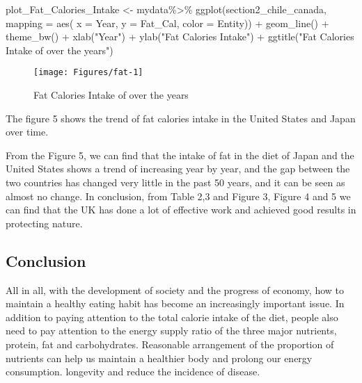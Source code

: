 \documentclass[11pt,a4paper,]{article}
\newenvironment{Shaded}{\begin{snugshade}}{\end{snugshade}}
\newcommand{\AttributeTok}[1]{\textcolor[rgb]{0.77,0.63,0.00}{#1}}
\newcommand{\FunctionTok}[1]{\textcolor[rgb]{0.00,0.00,0.00}{#1}}
\newcommand{\NormalTok}[1]{#1}
\newcommand{\OtherTok}[1]{\textcolor[rgb]{0.56,0.35,0.01}{#1}}
\newcommand{\SpecialCharTok}[1]{\textcolor[rgb]{0.00,0.00,0.00}{#1}}
\newcommand{\StringTok}[1]{\textcolor[rgb]{0.31,0.60,0.02}{#1}}
\begin{document}
\begin{Shaded}
\begin{Highlighting}[]
\NormalTok{plot\_Fat\_Calories\_Intake }\OtherTok{\textless{}{-}}\NormalTok{ mydata}\SpecialCharTok{\%\textgreater{}\%} 
  \FunctionTok{ggplot}\NormalTok{(section2\_chile\_canada, }\AttributeTok{mapping =}  \FunctionTok{aes}\NormalTok{(}
    \AttributeTok{x =}\NormalTok{ Year, }
    \AttributeTok{y =}\NormalTok{ Fat\_Cal, }
    \AttributeTok{color =}\NormalTok{ Entity)) }\SpecialCharTok{+}
  \FunctionTok{geom\_line}\NormalTok{() }\SpecialCharTok{+}
  \FunctionTok{theme\_bw}\NormalTok{() }\SpecialCharTok{+}
  \FunctionTok{xlab}\NormalTok{(}\StringTok{"Year"}\NormalTok{) }\SpecialCharTok{+}
  \FunctionTok{ylab}\NormalTok{(}\StringTok{"Fat Calories Intake"}\NormalTok{) }\SpecialCharTok{+}
  \FunctionTok{ggtitle}\NormalTok{(}\StringTok{"Fat Calories Intake of over the years"}\NormalTok{)}
\end{Highlighting}
\end{Shaded}

\begin{figure}[H]
\texttt{[image: Figures/fat-1]}
\caption{Fat Calories Intake of over the years}
\label{fig:fat}
\end{figure}

The figure 5 shows the trend of fat calories intake in the United States and Japan over time.

From the Figure 5, we can find that the intake of fat in the diet of Japan and the United States shows a trend of increasing year by year, and the gap between the two countries has changed very little in the past 50 years, and it can be seen as almost no change.
In conclusion, from Table 2,3 and Figure 3, Figure 4 and 5 we can find that the UK has done a lot of effective work and achieved good results in protecting nature.

\subsection*{Conclusion}

All in all, with the development of society and the progress of economy, how to maintain a healthy eating habit has become an increasingly important issue. In addition to paying attention to the total calorie intake of the diet, people also need to pay attention to the energy supply ratio of the three major nutrients, protein, fat and carbohydrates. Reasonable arrangement of the proportion of nutrients can help us maintain a healthier body and prolong our energy consumption. longevity and reduce the incidence of disease.
\end{document}
